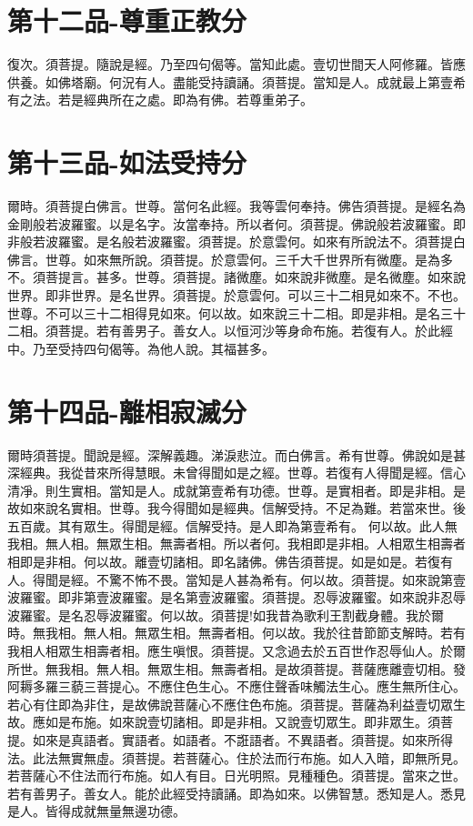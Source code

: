 \documentclass[a6paper, 22pt, twocolumn]{cvertbook}
\begin{document}
\chapter{第十二品-尊重正教分}
\large 復次。須菩提。隨說是經。乃至四句偈等。當知此處。壹切世間天人阿修羅。皆應供養。如佛塔廟。何況有人。盡能受持讀誦。須菩提。當知是人。成就最上第壹希有之法。若是經典所在之處。即為有佛。若尊重弟子。
\chapter{第十三品-如法受持分}
\large 爾時。須菩提白佛言。世尊。當何名此經。我等雲何奉持。佛告須菩提。是經名為金剛般若波羅蜜。以是名字。汝當奉持。所以者何。須菩提。佛說般若波羅蜜。即非般若波羅蜜。是名般若波羅蜜。須菩提。於意雲何。如來有所說法不。須菩提白佛言。世尊。如來無所說。須菩提。於意雲何。三千大千世界所有微塵。是為多不。須菩提言。甚多。世尊。須菩提。諸微塵。如來說非微塵。是名微塵。如來說世界。即非世界。是名世界。須菩提。於意雲何。可以三十二相見如來不。不也。世尊。不可以三十二相得見如來。何以故。如來說三十二相。即是非相。是名三十二相。須菩提。若有善男子。善女人。以恒河沙等身命布施。若復有人。於此經中。乃至受持四句偈等。為他人說。其福甚多。
\chapter{第十四品-離相寂滅分}
\large 爾時須菩提。聞說是經。深解義趣。涕淚悲泣。而白佛言。希有世尊。佛說如是甚深經典。我從昔來所得慧眼。未曾得聞如是之經。世尊。若復有人得聞是經。信心清凈。則生實相。當知是人。成就第壹希有功德。世尊。是實相者。即是非相。是故如來說名實相。世尊。我今得聞如是經典。信解受持。不足為難。若當來世。後五百歲。其有眾生。得聞是經。信解受持。是人即為第壹希有。
何以故。此人無我相。無人相。無眾生相。無壽者相。所以者何。我相即是非相。人相眾生相壽者相即是非相。何以故。離壹切諸相。即名諸佛。佛告須菩提。如是如是。若復有人。得聞是經。不驚不怖不畏。當知是人甚為希有。何以故。須菩提。如來說第壹波羅蜜。即非第壹波羅蜜。是名第壹波羅蜜。須菩提。忍辱波羅蜜。如來說非忍辱波羅蜜。是名忍辱波羅蜜。何以故。須菩提!如我昔為歌利王割截身體。我於爾時。無我相。無人相。無眾生相。無壽者相。何以故。我於往昔節節支解時。若有我相人相眾生相壽者相。應生嗔恨。須菩提。又念過去於五百世作忍辱仙人。於爾所世。無我相。無人相。無眾生相。無壽者相。是故須菩提。菩薩應離壹切相。發阿耨多羅三藐三菩提心。不應住色生心。不應住聲香味觸法生心。應生無所住心。若心有住即為非住，是故佛說菩薩心不應住色布施。須菩提。菩薩為利益壹切眾生故。應如是布施。如來說壹切諸相。即是非相。又說壹切眾生。即非眾生。須菩提。如來是真語者。實語者。如語者。不誑語者。不異語者。須菩提。如來所得法。此法無實無虛。須菩提。若菩薩心。住於法而行布施。如人入暗，即無所見。若菩薩心不住法而行布施。如人有目。日光明照。見種種色。須菩提。當來之世。若有善男子。善女人。能於此經受持讀誦。即為如來。以佛智慧。悉知是人。悉見是人。皆得成就無量無邊功德。
\end{document}

